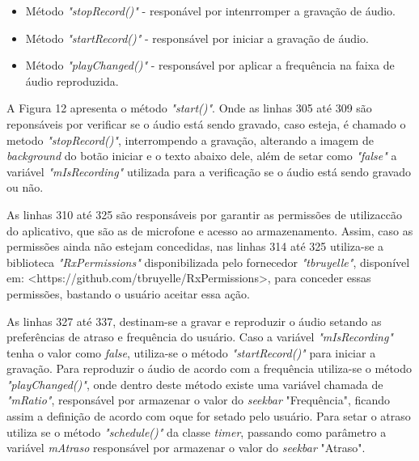 \begin{itemize}
	
	\item  M\'etodo \textit{"stopRecord()"} - respon\'avel por intenrromper a grava\c{c}\~ao de \'audio. 
	
	\item  M\'etodo \textit{"startRecord()"} - respons\'avel por iniciar a grava\c{c}\~ao de \'audio. 
	
	\item M\'etodo \textit{"playChanged()"} - respons\'avel por aplicar a frequ\^encia na faixa de \'audio reproduzida.  
	
\end{itemize}

 A Figura 12 apresenta o m\'etodo \textit{"start()"}. Onde as linhas 305 at\'e 309 s\~ao repons\'aveis por verificar se o \'audio est\'a sendo gravado, caso esteja, \'e chamado o metodo \textit{"stopRecord()"}, interrompendo a grava\c{c}\~ao, alterando a imagem de \textit{background} do bot\~ao iniciar e o texto abaixo dele, al\'em de setar como \textit{"false"} a vari\'avel \textit{"mIsRecording"} utilizada para a verifica\c{c}\~ao se o \'audio est\'a sendo gravado ou n\~ao.
 
 As linhas 310 at\'e 325 s\~ao respons\'aveis por garantir as permiss\~oes de utilizac{c}\~ao do aplicativo, que s\~ao as de microfone e acesso ao armazenamento. Assim, caso as permiss\~oes ainda n\~ao estejam concedidas, nas linhas 314 at\'e 325 utiliza-se a biblioteca \textit{"RxPermissions"} disponibilizada pelo fornecedor \textit{"tbruyelle"}, dispon\'ivel em: <https://github.com/tbruyelle/RxPermissions>, para conceder essas permiss\~oes, bastando o usu\'ario aceitar essa a\c{c}\~ao.
 
 As linhas 327 at\'e 337, destinam-se a gravar e reproduzir o \'audio setando as prefer\^encias de atraso e frequ\^encia do usu\'ario. Caso a vari\'avel \textit{"mIsRecording"} tenha o valor como \textit{false}, utiliza-se o m\'etodo \textit{"startRecord()"} para iniciar a grava\c{c}\~ao. Para reproduzir o \'audio de acordo com a frequ\^encia utiliza-se o m\'etodo \textit{"playChanged()"}, onde dentro deste m\'etodo existe uma vari\'avel chamada de \textit{"mRatio"}, respons\'avel por armazenar o valor do \textit{seekbar} "Frequ\^encia", ficando assim a defini\c{c}\~ao de acordo com oque for setado pelo usu\'ario. Para setar o atraso utiliza se o m\'etodo \textit{"schedule()"} da classe \textit{timer}, passando como par\^ametro a vari\'avel \textit{mAtraso} respons\'avel por armazenar o valor do \textit{seekbar} "Atraso". 
 
